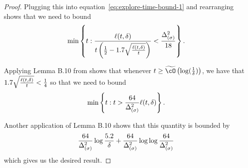 \begin{proof}
                    Plugging this into equation~\eqref{eq:explore-time-bound-1} and rearranging shows that we need to bound
                    \begin{equation}
                        \min\left\{ t : \frac{\ell(t, \delta)}{t\left( \frac{1}{2} - 1.7 \sqrt{\frac{\ell(t, \delta)}{t}} \right)} < \frac{\Delta_{(\sigma)}^2}{18} \right\}.
                    \end{equation}


                    Applying Lemma B.10 from \cite{neopane2024logarithmic} shows that whenever $\round \geq \bigTildeO[\log(\frac{1}{\errorProb})]$, we have that $1.7 \sqrt{\frac{\ell(t, \delta)}{t}} < \frac{1}{4}$ so that we need to bound
                    \begin{equation}
                        \min\left\{ t : t > \frac{64}{\Delta_{(\sigma)}^2} \ell(t, \delta) \right\}.
                    \end{equation}

                    Another application of Lemma B.10 shows that this quantity is bounded by 
                    \begin{equation}
                        \frac{64}{\Delta_{(\sigma)}^2} \log\frac{5.2}{\delta} + \frac{64}{\Delta_{(\sigma)}^2} \log \log \frac{64}{\Delta_{(\sigma)}^2}
                    \end{equation}
                    which  gives us the desired result.
                    
        
        \end{proof}
    
